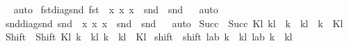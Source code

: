 \begin{isabellebody}
\isadelimproof
\ %
\endisadelimproof
%
\isatagproof
{}\isamarkupfalse%
\ auto%
\endisatagproof
{\isafoldproof}%
%
\isadelimproof
%
\endisadelimproof
\isanewline
{}\isamarkupfalse%
\ fst{\isacharunderscore}{\kern0pt}diag{\isacharunderscore}{\kern0pt}snd{\isacharcolon}{\kern0pt}\ {\isachardoublequoteopen}fst\ {\isasymcirc}\ {\isacharparenleft}{\kern0pt}{\isacharparenleft}{\kern0pt}{\isasymlambda}x{\isachardot}{\kern0pt}\ {\isacharparenleft}{\kern0pt}x{\isacharcomma}{\kern0pt}\ x{\isacharparenright}{\kern0pt}{\isacharparenright}{\kern0pt}\ {\isasymcirc}\ snd{\isacharparenright}{\kern0pt}\ {\isacharequal}{\kern0pt}\ snd{\isachardoublequoteclose}%
\isadelimproof
\ %
\endisadelimproof
%
\isatagproof
{}\isamarkupfalse%
\ auto%
\endisatagproof
{\isafoldproof}%
%
\isadelimproof
%
\endisadelimproof
\isanewline
{}\isamarkupfalse%
\ snd{\isacharunderscore}{\kern0pt}diag{\isacharunderscore}{\kern0pt}snd{\isacharcolon}{\kern0pt}\ {\isachardoublequoteopen}snd\ {\isasymcirc}\ {\isacharparenleft}{\kern0pt}{\isacharparenleft}{\kern0pt}{\isasymlambda}x{\isachardot}{\kern0pt}\ {\isacharparenleft}{\kern0pt}x{\isacharcomma}{\kern0pt}\ x{\isacharparenright}{\kern0pt}{\isacharparenright}{\kern0pt}\ {\isasymcirc}\ snd{\isacharparenright}{\kern0pt}\ {\isacharequal}{\kern0pt}\ snd{\isachardoublequoteclose}%
\isadelimproof
\ %
\endisadelimproof
%
\isatagproof
{}\isamarkupfalse%
\ auto%
\endisatagproof
{\isafoldproof}%
%
\isadelimproof
%
\endisadelimproof
\isanewline
\isanewline
{}\isamarkupfalse%
\ Succ\ \ {\isachardoublequoteopen}Succ\ Kl\ kl\ {\isacharequal}{\kern0pt}\ {\isacharbraceleft}{\kern0pt}k\ {\isachardot}{\kern0pt}\ kl\ {\isacharat}{\kern0pt}\ {\isacharbrackleft}{\kern0pt}k{\isacharbrackright}{\kern0pt}\ {\isasymin}\ Kl{\isacharbraceright}{\kern0pt}{\isachardoublequoteclose}\isanewline
{}\isamarkupfalse%
\ Shift\ \ {\isachardoublequoteopen}Shift\ Kl\ k\ {\isacharequal}{\kern0pt}\ {\isacharbraceleft}{\kern0pt}kl{\isachardot}{\kern0pt}\ k\ {\isacharhash}{\kern0pt}\ kl\ {\isasymin}\ Kl{\isacharbraceright}{\kern0pt}{\isachardoublequoteclose}\isanewline
{}\isamarkupfalse%
\ shift\ \ {\isachardoublequoteopen}shift\ lab\ k\ {\isacharequal}{\kern0pt}\ {\isacharparenleft}{\kern0pt}{\isasymlambda}kl{\isachardot}{\kern0pt}\ lab\ {\isacharparenleft}{\kern0pt}k\ {\isacharhash}{\kern0pt}\ kl{\isacharparenright}{\kern0pt}{\isacharparenright}{\kern0pt}{\isachardoublequoteclose}\isanewline
\isanewline
{}\isamarkupfalse%

\end{isabellebody}

